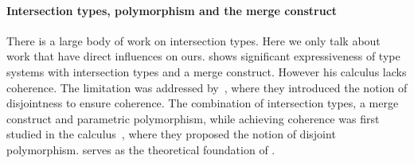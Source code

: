 





\paragraph{Intersection types, polymorphism and the merge construct}

There is a large body of work on intersection types. Here we only talk about
work that have direct influences on ours. \citet{dunfield2014elaborating} shows
significant expressiveness of type systems with intersection types and a merge
construct. However his calculus lacks coherence. The limitation was addressed
by~\citet{oliveira2016disjoint}, where they introduced the notion of
disjointness to ensure coherence. The combination of intersection types, a merge
construct and parametric polymorphism, while achieving coherence was first
studied in the \bname calculus~\cite{alpuimdisjoint}, where they proposed the
notion of disjoint polymorphism. \bname serves as the theoretical foundation of
\name.


